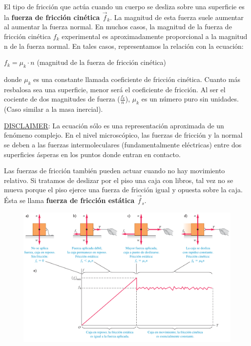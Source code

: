 \documentclass{article}
\newcommand{\bl}[1]{\textbf{#1}}
\newcommand{\definicion}[1]{%
    \vspace{0.5cm}
    \begin{definicionbox}
        #1
    \end{definicionbox}
    \vspace{0.5cm}
}
\begin{document}
    \par El tipo de fricción que actúa cuando un cuerpo se desliza sobre una superficie es la \bl{fuerza de fricción cinética $\vec{f}_k$}. La magnitud de esta fuerza suele aumentar al aumentar la fuerza normal. En muchos casos, la magnitud de la fuerza de fricción cinética $f_k$ experimental es aproximadamente proporcional a la magnitud n de la fuerza normal. En tales casos, representamos la relación con la ecuación:

    \definicion{
        \centering
        \par \( f_k = \mu_k \cdot n \) \quad \quad \quad (magnitud de la fuerza de fricción cinética)
    }

    \par donde $\mu_k$ es una constante llamada coeficiente de fricción cinética. Cuanto más resbalosa sea una superficie, menor será el coeficiente de fricción. Al ser el cociente de dos magnitudes de fuerza ($\frac{{f}_k}{{n}}$), $\mu_k$ es un número puro sin unidades. (Caso similar a la masa inercial).

    \vspace{0.5cm}

    \par \color{red} \underline{DISCLAIMER}: \color{black} La ecuación sólo es una representación aproximada de un fenómeno complejo. En el nivel microscópico, las fuerzas de fricción y la normal se deben a las fuerzas intermoleculares (fundamentalmente eléctricas) entre dos superficies ásperas en los puntos donde entran en contacto.

    \vspace{0.5cm}

    \par Las fuerzas de fricción también pueden actuar cuando no hay movimiento relativo. Si tratamos de deslizar por el piso una caja con libros, tal vez no se mueva porque el piso ejerce una fuerza de fricción igual y opuesta sobre la caja. Ésta se llama \bl{fuerza de fricción estática $\vec{f}_s$}.

    \begin{figure}[H]
        \centering
        \includegraphics[width=\textwidth]{img/3.3-2.png}
    \end{figure}
\end{document}
